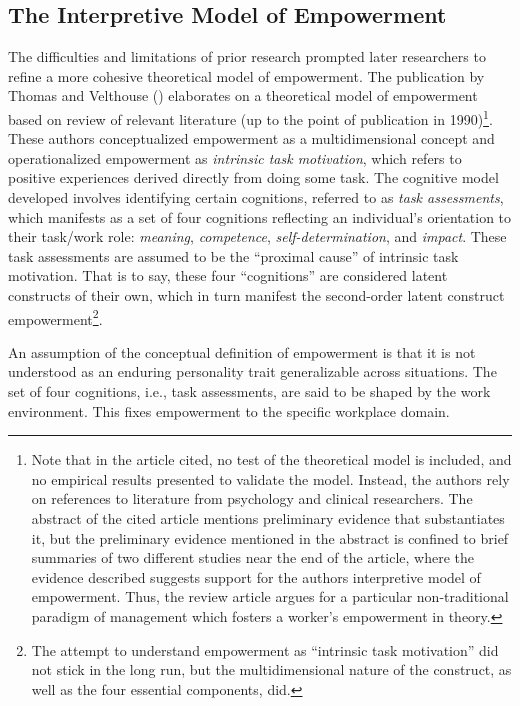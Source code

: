 \documentclass[
  11pt,
  a4paper,
]{article}
\begin{document}
\subsection{The Interpretive Model of
Empowerment}\label{the-interpretive-model-of-empowerment}

The difficulties and limitations of prior research prompted later
researchers to refine a more cohesive theoretical model of empowerment.
The publication by Thomas and Velthouse
() elaborates on a theoretical model of
empowerment based on review of relevant literature (up to the point of
publication in 1990)\footnote{Note that in the article cited, no test of
  the theoretical model is included, and no empirical results presented
  to validate the model. Instead, the authors rely on references to
  literature from psychology and clinical researchers. The abstract of
  the cited article mentions preliminary evidence that substantiates it,
  but the preliminary evidence mentioned in the abstract is confined to
  brief summaries of two different studies near the end of the article,
  where the evidence described suggests support for the authors
  interpretive model of empowerment. Thus, the review article argues for
  a particular non-traditional paradigm of management which fosters a
  worker's empowerment in theory.}. These authors conceptualized
empowerment as a multidimensional concept and operationalized
empowerment as \emph{intrinsic task motivation}, which refers to
positive experiences derived directly from doing some task. The
cognitive model developed involves identifying certain cognitions,
referred to as \emph{task assessments}, which manifests as a set of four
cognitions reflecting an individual's orientation to their task/work
role: \emph{meaning}, \emph{competence}, \emph{self-determination}, and
\emph{impact}. These task assessments are assumed to be the ``proximal
cause'' of intrinsic task motivation. That is to say, these four
``cognitions'' are considered latent constructs of their own, which in
turn manifest the second-order latent construct empowerment\footnote{The
  attempt to understand empowerment as ``intrinsic task motivation'' did
  not stick in the long run, but the multidimensional nature of the
  construct, as well as the four essential components, did.}.

An assumption of the conceptual definition of empowerment is that it is
not understood as an enduring personality trait generalizable across
situations. The set of four cognitions, i.e., task assessments, are said
to be shaped by the work environment. This fixes empowerment to the
specific workplace domain.
\end{document}
